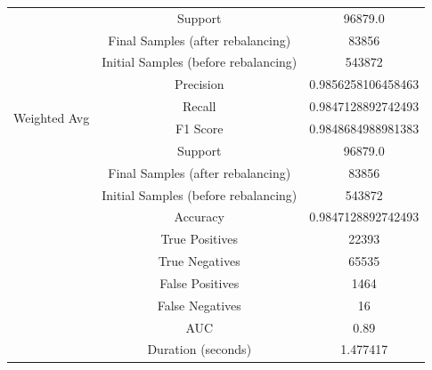 \begin{longtable}{|c|c|c|}
 & Support & 96879.0 \\
 & Final Samples (after rebalancing) & 83856 \\
 & Initial Samples (before rebalancing) & 543872 \\
\hline
\multirow{4}{*}{Weighted Avg} & Precision & 0.9856258106458463 \\
 & Recall & 0.9847128892742493 \\
 & F1 Score & 0.9848684988981383 \\
 & Support & 96879.0 \\
 & Final Samples (after rebalancing) & 83856 \\
 & Initial Samples (before rebalancing) & 543872 \\
\hline
& Accuracy & 0.9847128892742493 \\ \hline
& True Positives & 22393 \\ \hline
& True Negatives & 65535 \\ \hline
& False Positives & 1464 \\ \hline
& False Negatives & 16 \\ \hline
& AUC & 0.89 \\ \hline
& Duration (seconds) & 1.477417 \\ \hline
\end{longtable}


